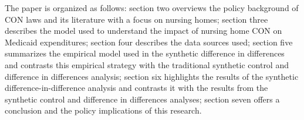 \documentclass[../Main.tex]{subfiles}
\begin{document}
\indent The paper is organized as follows: section two overviews the policy background of CON laws and its literature with a focus on nursing homes; section three describes the model used to understand the impact of nursing home CON on Medicaid expenditures; section four describes the data sources used; section five summarizes the empirical model used in the synthetic difference in differences and contrasts this empirical strategy with the traditional synthetic control and difference in differences analysis; section six highlights the results of the synthetic difference-in-difference analysis and contrasts it with the results from the synthetic control and difference in differences analyses; section seven offers a conclusion and the policy implications of this research.
\end{document}

